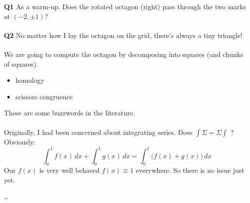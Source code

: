 \documentclass[12pt]{article}
\begin{document}
\textbf{Q1} As a warm-up.  Does the rotated octagon (right) pass through the two marks at $(-2, \pm 1)$? \\ \\
\textbf{Q2} No matter how I lay the octagon on the grid, there's always a tiny triangle! \\ \\
We are going to compute the octagon by decomposing into squares (and chunks of squares).
\begin{itemize}
\item homology
\item scissors congruence
\end{itemize}
These are some buzzwords in the literature.  \\ \\
Originally, I had been concerned about integrating series.  Does $\int \Sigma = \Sigma \int$ ?  Obviously:
$$ \int_0^1 f(x) \, dx 
+ \int_0^1 g(x) \, dx = \int_0^1 \Big( f(x) + g(x) \Big) \, dx$$
Our $f(x)$ is very well behaved $f(x) \equiv 1$ everywhere.  So there is no issue just yet.

\vfill

\selectfont \fontsize{12}{10}\selectfont

\begin{thebibliography}{}



\item  \dots

\end{thebibliography}
\end{document}

